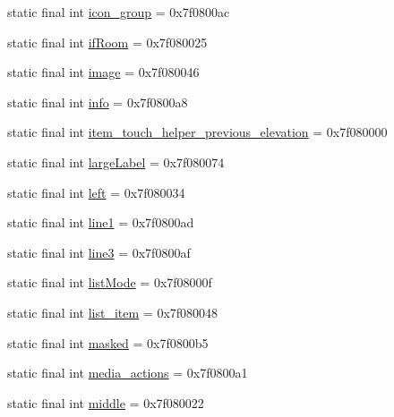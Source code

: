 \begin{CompactItemize}
\item 
static final int \hyperlink{classandroid_1_1support_1_1v7_1_1palette_1_1_r_1_1id_830570e01ddfa4ab93333e5521d34d48}{icon\_\-group} = 0x7f0800ac
\item 
static final int \hyperlink{classandroid_1_1support_1_1v7_1_1palette_1_1_r_1_1id_7fb64772d75f1faa41a3e79835457ccc}{ifRoom} = 0x7f080025
\item 
static final int \hyperlink{classandroid_1_1support_1_1v7_1_1palette_1_1_r_1_1id_1bb4f49aa8c80a050bb81826fe113ee9}{image} = 0x7f080046
\item 
static final int \hyperlink{classandroid_1_1support_1_1v7_1_1palette_1_1_r_1_1id_ae263f1eca9978cea8fad30514280a93}{info} = 0x7f0800a8
\item 
static final int \hyperlink{classandroid_1_1support_1_1v7_1_1palette_1_1_r_1_1id_256e13036530ab5cdd066c22c110e665}{item\_\-touch\_\-helper\_\-previous\_\-elevation} = 0x7f080000
\item 
static final int \hyperlink{classandroid_1_1support_1_1v7_1_1palette_1_1_r_1_1id_735c953380990e99486896925e5ef2f3}{largeLabel} = 0x7f080074
\item 
static final int \hyperlink{classandroid_1_1support_1_1v7_1_1palette_1_1_r_1_1id_affce55a096b05786c0ba8bccde4cc2b}{left} = 0x7f080034
\item 
static final int \hyperlink{classandroid_1_1support_1_1v7_1_1palette_1_1_r_1_1id_5a23459582414196f252ba6e16016c5d}{line1} = 0x7f0800ad
\item 
static final int \hyperlink{classandroid_1_1support_1_1v7_1_1palette_1_1_r_1_1id_3bc3dd764143ffb54cedf30db5354127}{line3} = 0x7f0800af
\item 
static final int \hyperlink{classandroid_1_1support_1_1v7_1_1palette_1_1_r_1_1id_7a3f6edad82ac6c006eaee649b9b1ccf}{listMode} = 0x7f08000f
\item 
static final int \hyperlink{classandroid_1_1support_1_1v7_1_1palette_1_1_r_1_1id_e8c619212812b2ba95c67e67eaebecc6}{list\_\-item} = 0x7f080048
\item 
static final int \hyperlink{classandroid_1_1support_1_1v7_1_1palette_1_1_r_1_1id_bc0b4e25772bf83fbaab7c94d46c2b7c}{masked} = 0x7f0800b5
\item 
static final int \hyperlink{classandroid_1_1support_1_1v7_1_1palette_1_1_r_1_1id_3d59c2458436862b825115f2c4ee1710}{media\_\-actions} = 0x7f0800a1
\item 
static final int \hyperlink{classandroid_1_1support_1_1v7_1_1palette_1_1_r_1_1id_65b7eb7c6f5d916d041eaf569994b883}{middle} = 0x7f080022

\end{CompactItemize}
